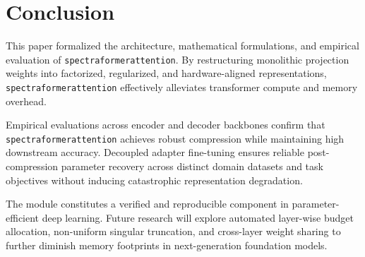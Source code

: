\section{Conclusion}
This paper formalized the architecture, mathematical formulations, and empirical evaluation of \texttt{spectraformerattention}. By restructuring monolithic projection weights into factorized, regularized, and hardware-aligned representations, \texttt{spectraformerattention} effectively alleviates transformer compute and memory overhead.

Empirical evaluations across encoder and decoder backbones confirm that \texttt{spectraformerattention} achieves robust compression while maintaining high downstream accuracy. Decoupled adapter fine-tuning ensures reliable post-compression parameter recovery across distinct domain datasets and task objectives without inducing catastrophic representation degradation.

The module constitutes a verified and reproducible component in parameter-efficient deep learning. Future research will explore automated layer-wise budget allocation, non-uniform singular truncation, and cross-layer weight sharing to further diminish memory footprints in next-generation foundation models.
